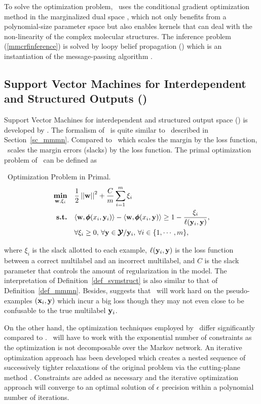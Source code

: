 {To solve the optimization problem, \mmcrf\ uses the conditional gradient optimization method \citep{Bertsekas95nonlinear} in the marginalized dual space \citep{Taskar04max}, which not only benefits from a polynomial-size parameter space but also enables kernels that can deal with the non-linearity of the complex molecular structures.
The inference problem (\ref{mmcrfinference}) is solved by loopy belief propagation (\lbp) which is an instantiation of the message-passing algorithm \citep{Wainwright08graphical}.



%
% 
\subsection{Support Vector Machines for Interdependent and Structured Outputs (\svmstruct)} \label{sc_svmstruct}

Support Vector Machines for interdependent and structured output space (\svmstruct) is developed by \citet{THJA04,TJTA05}.
The formalism of \svmstruct\ is quite similar to \mmmn\ described in Section~\ref{sc_mmmn}.
Compared to \mmmn\ which scales the margin by the loss function, \svmstruct\ scales the margin errors ({slacks}) by the loss function.
The primal optimization problem of \svmstruct\ can be defined as
\begin{definition}{\svmstruct\ Optimization Problem in Primal.}\label{def_svmstruct}
	\begin{align*}
		\underset{\mathbf {w},\xi_i}{\textbf{min}} & \quad\frac{1}{2}\left|\left| \mathbf {w} \right|\right|^2 + \frac{C}{m}\sum_{i=1}^{m}\xi_i \\
		\textbf{s.t.} & \quad\langle \mathbf {w}, \pmb \phi(x_i,\mathbf {y}_i) \rangle - \langle \mathbf {w}, \pmb \phi(x_i,\mathbf {y}) \rangle \ge 1-\frac{\xi_i}{\mathbf {\ell}(\mathbf {y}_i,\mathbf {y})},\\
		& \quad \forall \xi_i\ge0,\, \forall \mathbf {y}\in\pmb {\mathcal{Y}}/\mathbf {y}_i,\, \forall i\in\{1,\cdots,m\},
	\end{align*}
\end{definition}
\noindent
where $\xi_i$ is the slack allotted to each example, $\mathbf {\ell}(\mathbf {y}_i,\mathbf {y})$ is the loss function between a correct multilabel and an incorrect multilabel, and $C$ is the slack parameter that controls the amount of regularization in the model.
The interpretation of Definition~\ref{def_svmstruct} is also similar to that of Definition~\ref{def_mmmn}.
Besides, \citet{THJA04} suggests that \mmmn\ will work hard on the pseudo-examples $(\mathbf {x}_i,\mathbf {y})$ which incur a big loss though they may not even close to be confusable to the true multilabel $\mathbf {y}_i$.

On the other hand, the optimization techniques employed by \svmstruct\ differ significantly compared to \mmmn.
\svmstruct\ will have to work with the exponential number of constraints as the optimization is not decomposable over the Markov network.
An iterative optimization approach \citet{THJA04} has been developed which creates a nested sequence of successively tighter relaxations of the original problem via the cutting-plane method \citep{Bishop07,JFY09}.
Constraints are added as necessary and the iterative optimization approach will converge to an optimal solution of $\epsilon$ precision within a polynomial number of iterations.

}
